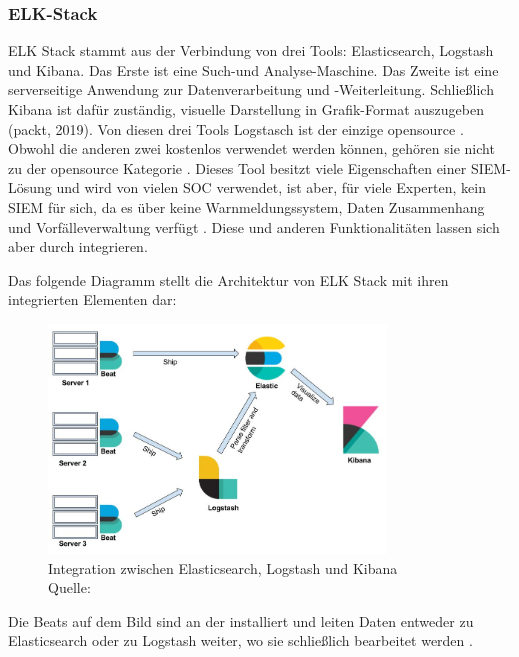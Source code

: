 \subsubsection{ELK-Stack}
ELK Stack stammt aus der Verbindung von drei Tools: Elasticsearch, Logstash und Kibana. Das Erste ist eine Such-und Analyse-Maschine. Das Zweite ist eine serverseitige Anwendung zur Datenverarbeitung und -Weiterleitung. Schließlich Kibana \label{kibana} ist dafür zuständig, visuelle Darstellung in Grafik-Format auszugeben (packt, 2019). Von diesen drei Tools Logstasch ist der einzige \gls{opensource} \citep{elastic_OSI}. Obwohl die anderen zwei 
kostenlos verwendet werden können, gehören sie nicht zu der \gls{opensource} Kategorie \citep{OpenSource_Def}. Dieses Tool besitzt viele Eigenschaften einer \gls{SIEM}-Lösung und wird von vielen SOC verwendet, ist aber, für viele Experten, kein \gls{SIEM} für sich, da es über keine Warnmeldungssystem, Daten Zusammenhang und Vorfälleverwaltung verfügt \citep{Miller_ELK}. Diese und anderen Funktionalitäten lassen sich aber durch  integrieren. 

\newpage
Das folgende Diagramm stellt die Architektur von ELK Stack mit ihren integrierten Elementen dar:

\begin{figure}[H]
   \centering
   \includegraphics[width=0.8\textwidth]{assets/2_p8.png}
   \caption[Integration zwischen Elasticsearch, Logstash und Kibana]
   {Integration zwischen Elasticsearch, Logstash und Kibana\\Quelle: \citep{packt_elkstack} }
   \centering
\end{figure}

Die Beats auf dem Bild sind an der  installiert und leiten Daten entweder zu Elasticsearch oder zu Logstash weiter, wo sie schließlich bearbeitet werden \citep{Jain_LMELK}. 

